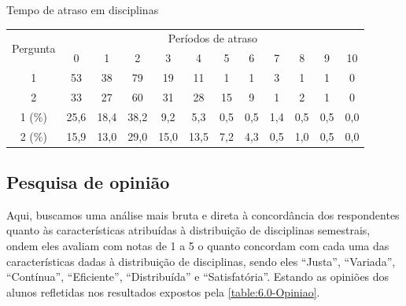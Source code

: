 \begin{apendicesenv}
  \begin{CenteredTable} \caption{Tempo de atraso em disciplinas} \label{table:5.0-Atrasos}
    \begin{tabular}{| c | c c c c c c c c c c c |}
      \hline
      \multicolumn{1}{|c|}{\multirow{2}{*}{Pergunta}} &
      \multicolumn{11}{c|}{Períodos de atraso}                                                          \\
      \multicolumn{1}{|c|}{}                          &
      \multicolumn{1}{c|}{0}                          &
      \multicolumn{1}{c|}{1}                          &
      \multicolumn{1}{c|}{2}                          &
      \multicolumn{1}{c|}{3}                          &
      \multicolumn{1}{c|}{4}                          &
      \multicolumn{1}{c|}{5}                          &
      \multicolumn{1}{c|}{6}                          &
      \multicolumn{1}{c|}{7}                          &
      \multicolumn{1}{c|}{8}                          &
      \multicolumn{1}{c|}{9}                          &
      \multicolumn{1}{|c|}{10}
      \\
      \hline
      1                                               & 53   & 38   & 79   & 19   & 11   & 1   & 1   & 3   & 1   & 1   & 0   \\
      2                                               & 33   & 27   & 60   & 31   & 28   & 15  & 9   & 1   & 2   & 1   & 0   \\
      \hline
      1 (\%)                                          & 25,6 & 18,4 & 38,2 & 9,2  & 5,3  & 0,5 & 0,5 & 1,4 & 0,5 & 0,5 & 0,0 \\
      2 (\%)                                          & 15,9 & 13,0 & 29,0 & 15,0 & 13,5 & 7,2 & 4,3 & 0,5 & 1,0 & 0,5 & 0,0 \\
      \hline
    \end{tabular}
  \end{CenteredTable}

  \subsection{Pesquisa de opinião} %

  Aqui, buscamos uma análise mais bruta e direta à concordância dos respondentes quanto às características atribuídas à distribuição de disciplinas semestrais, ondem eles avaliam com notas de 1 a 5 o quanto concordam com cada uma das características dadas à distribuição de disciplinas, sendo eles ``Justa'', ``Variada'', ``Contínua'', ``Eficiente'', ``Distribuída'' e ``Satisfatória''. Estando as opiniões dos alunos refletidas nos resultados expostos pela \autoref{table:6.0-Opiniao}.


\end{apendicesenv}
